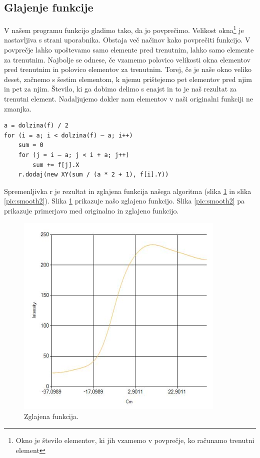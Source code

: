\documentclass[oneside, a4paper, 12pt]{book}
\begin{document}
\subsection{Glajenje funkcije}
V našem programu funkcijo gladimo tako, da jo povprečimo. Velikost okna\footnote{Okno je število elementov, ki jih vzamemo v povprečje, ko računamo trenutni element} je nastavljiva s strani uporabnika. Obstaja več načinov kako povprečiti funkcijo. V povprečje lahko upoštevamo samo elemente pred trenutnim, lahko samo elemente za trenutnim. Najbolje se odnese, če vzamemo polovico velikosti okna elementov pred trenutnim in polovico elementov za trenutnim. Torej, če je naše okno veliko deset, začnemo s šestim elementom, k njemu prištejemo pet elementov pred njim in pet za njim. Število, ki ga dobimo delimo s enajst in to je naš rezultat za trenutni element. Nadaljujemo dokler nam elementov v naši originalni funkciji ne zmanjka. 

\begin{verbatim}
a = dolzina(f) / 2
for (i = a; i < dolzina(f) – a; i++)
    sum = 0
    for (j = i – a; j < i + a; j++)
        sum += f[j].X
    r.dodaj(new XY(sum / (a * 2 + 1), f[i].Y))
\end{verbatim}

Spremenljivka r je rezultat in zglajena funkcija našega algoritma (slika \ref{pic:smooth1} in slika \ref{pic:smooth2}).
Slika \ref{pic:smooth1} prikazuje našo zglajeno funkcijo. Slika \ref{pic:smooth2} pa prikazuje primerjavo med originalno in zglajeno funkcijo.

\begin{figure}
\begin{center}
\includegraphics[width=10cm]{slike/glajena-funkcija.jpg}
\end{center}
\caption{Zglajena funkcija.}
\label{pic:smooth1}
\end{figure}
\end{document}
